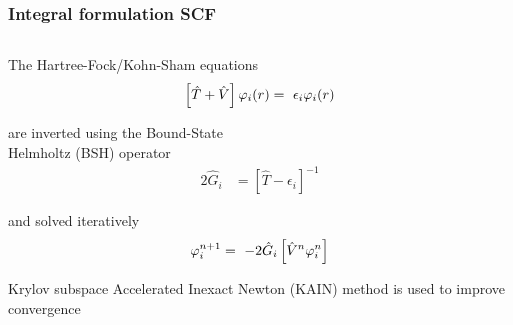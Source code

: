 \begin{frame}
    \frametitle{Integral formulation SCF}
    \begin{columns}
    \begin{column}[b]{0.45\textwidth}

    \centering
    The Hartree-Fock/Kohn-Sham equations
    \begin{equation}
        \nonumber
        \left[\hat{T} + \hat{V}\right]\varphi_i(r) =\ \epsilon_i \varphi_i(r)
    \end{equation}

    \vspace{5mm}
    are inverted using the Bound-State\\ Helmholtz (BSH) operator
    \begin{align}
        \nonumber
        2\hat{G}_i  &=  \left[\hat{T} - \epsilon_i\right]^{-1}
    \end{align}

    \vspace{5mm}
    and solved iteratively
    \begin{equation}
        \nonumber
        \orbital_i^{n+1} =\ -2\Helmholtz{\hat{V}^n\orbital_i^n}
    \end{equation}

    \vspace{5mm}
    Krylov subspace Accelerated Inexact Newton (KAIN) 
    method is used to improve convergence
    \vspace{10mm}
    \end{column}


\end{columns}
\end{frame}
